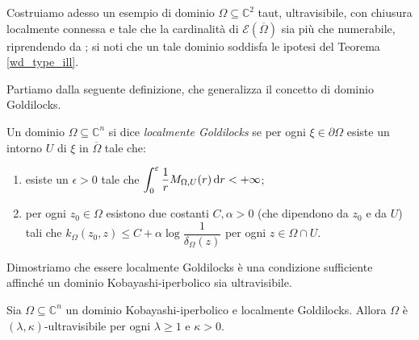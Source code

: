 Costruiamo adesso un esempio di dominio $\Omega\subseteq\mathbb{C}^2$ taut, ultravisibile, con chiusura localmente connessa e tale che la cardinalità di $\mathcal{E}(\overline{\Omega})$ sia più che numerabile, riprendendo da \cite[Section 2]{BZ2}; si noti che un tale dominio soddisfa le ipotesi del Teorema \ref{wd_type_ill}.

Partiamo dalla seguente definizione, che generalizza il concetto di dominio Goldilocks.

\begin{defn} \label{localgold}
    Un dominio $\Omega\subseteq\mathbb{C}^n$ si dice \textit{localmente Goldilocks} se per ogni $\xi\in\partial\Omega$ esiste un intorno $U$ di $\xi$ in $\overline{\Omega}$ tale che:
    \begin{enumerate}[label={(\arabic*)}]
        \item esiste un $\epsilon>0$ tale che $\displaystyle\int_0^\varepsilon \frac{1}{r}M_{\Omega,U}(r)\mathop{}\!\mathrm{d} r<+\infty$;
        \item per ogni $z_0\in\Omega$ esistono due costanti $C,\alpha>0$ (che dipendono da $z_0$ e da $U$) tali che $k_\Omega(z_0,z)\le C+\alpha\log{\dfrac{1}{\delta_\Omega(z)}}$ per ogni $z\in\Omega\cap U$.
    \end{enumerate}
\end{defn}

Dimostriamo che essere localmente Goldilocks è una condizione sufficiente affinché un dominio Kobayashi-iperbolico sia ultravisibile.

\begin{prop}
    Sia $\Omega\subseteq\mathbb{C}^n$ un dominio Kobayashi-iperbolico e localmente Goldilocks. Allora $\Omega$ è $(\lambda,\kappa)$-ultravisibile per ogni $\lambda\ge1$ e $\kappa>0$.
    \vspace*{-\baselineskip}
\end{prop}

